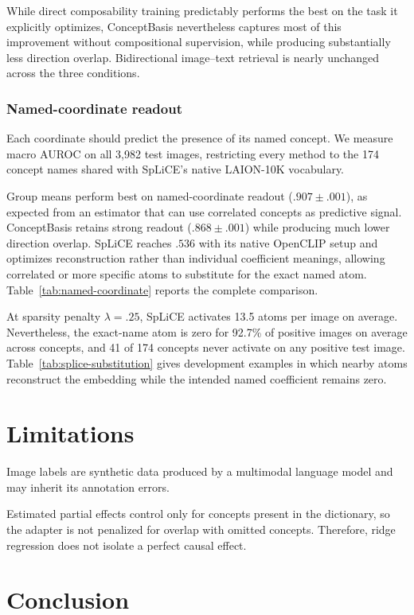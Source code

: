 \documentclass[mlmain,onecolumn]{jmlr}
\begin{document}
While direct composability training predictably performs the best on the task it explicitly optimizes, ConceptBasis nevertheless captures most of this improvement without compositional supervision, while producing substantially less direction overlap. Bidirectional image--text retrieval is nearly unchanged across the three conditions.

\subsubsection{Named-coordinate readout}

Each coordinate should predict the presence of its named concept. We measure macro AUROC on all 3,982 test images, restricting every method to the 174 concept names shared with SpLiCE's native LAION-10K vocabulary.

Group means perform best on named-coordinate readout ($.907\pm.001$), as expected from an estimator that can use correlated concepts as predictive signal. ConceptBasis retains strong readout ($.868\pm.001$) while producing much lower direction overlap. SpLiCE reaches $.536$ with its native OpenCLIP setup and optimizes reconstruction rather than individual coefficient meanings, allowing correlated or more specific atoms to substitute for the exact named atom. Table~\ref{tab:named-coordinate} reports the complete comparison.

At sparsity penalty $\lambda=.25$, SpLiCE activates 13.5 atoms per image on average. Nevertheless, the exact-name atom is zero for 92.7\% of positive images on average across concepts, and 41 of 174 concepts never activate on any positive test image. Table~\ref{tab:splice-substitution} gives development examples in which nearby atoms reconstruct the embedding while the intended named coefficient remains zero.

\section{Limitations}

Image labels are synthetic data produced by a multimodal language model and may inherit its annotation errors.

Estimated partial effects control only for concepts present in the dictionary, so the adapter is not penalized for overlap with omitted concepts. Therefore, ridge regression does not isolate a perfect causal effect.

\section{Conclusion}
\end{document}
